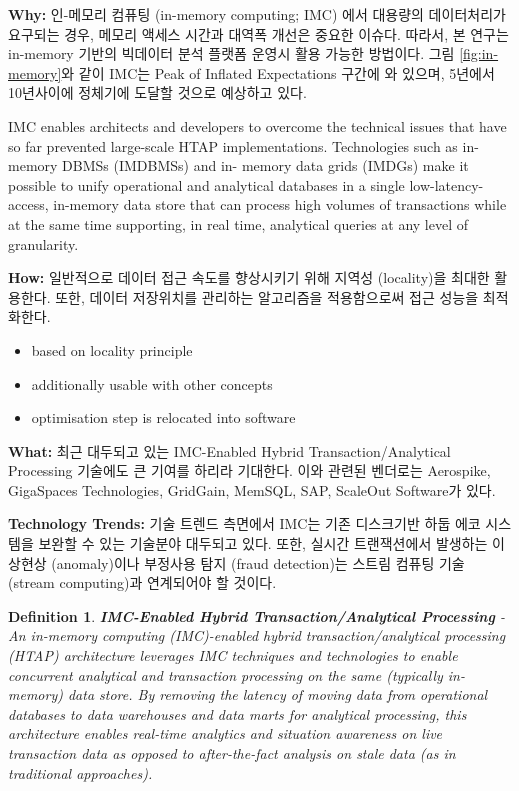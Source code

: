 \documentclass[twocolumn]{article}
\newcommand{\bi}{\begin{itemize}}
\newcommand{\ei}{\end{itemize}}
\newcommand{\ii}{\item}
\newtheorem{Def}{Definition}
\begin{document}
\noindent
\textbf{Why:} 인-메모리 컴퓨팅 (in-memory computing; IMC) \cite{Massimo:2014}에서 대용량의 데이터처리가 요구되는 경우, 메모리 액세스 시간과 대역폭 개선은 중요한 이슈다. 
따라서, 본 연구는 in-memory 기반의 빅데이터 분석 플랫폼 운영시 활용 가능한 방법이다. 
그림 \ref{fig:in-memory}와 같이 IMC는 Peak of Inflated Expectations 구간에 와 있으며, 5년에서 10년사이에 정체기에 도달할 것으로 예상하고 있다. 

IMC enables architects and developers to overcome the technical issues that have so far prevented large-scale HTAP implementations. Technologies such as in-memory DBMSs (IMDBMSs) and in- memory data grids (IMDGs) make it possible to unify operational and analytical databases in a single low-latency-access, in-memory data store that can process high volumes of transactions while at the same time supporting, in real time, analytical queries at any level of granularity.

\noindent
\textbf{How:} 일반적으로 데이터 접근 속도를 향상시키기 위해 지역성 (locality)을 최대한
 활용한다. 또한, 데이터 저장위치를 관리하는 알고리즘을 적용함으로써 접근 성능을 최적화한다.
\bi   
\ii based on locality principle
\ii additionally usable with other concepts
\ii optimisation step is relocated into software
\ei

\noindent
\textbf{What:}  
최근 대두되고 있는 IMC-Enabled Hybrid Transaction/Analytical Processing 기술에도 큰 기여를 하리라 기대한다. 이와 관련된 벤더로는 Aerospike, GigaSpaces Technologies, GridGain, MemSQL, SAP, ScaleOut Software가 있다.

\noindent
\textbf{Technology Trends:} 기술 트렌드 측면에서 IMC는 기존 디스크기반 하둡 에코 시스템을 보완할 수 있는 기술분야 대두되고 있다. 또한, 실시간 트랜잭션에서 발생하는 이상현상 (anomaly)이나 부정사용 탐지 (fraud detection)는 스트림 컴퓨팅 기술 (stream computing)과 연계되어야 할 것이다.

\begin{Def}
\textbf{IMC-Enabled Hybrid Transaction/Analytical Processing} - An \textit{in-memory computing} (IMC)-enabled hybrid transaction/analytical processing (HTAP) architecture leverages IMC techniques and technologies to enable concurrent analytical and transaction processing on the same (typically in-memory) data store. By removing the latency of moving data from operational databases to data warehouses and data marts for analytical processing, this architecture enables real-time analytics and situation awareness on live transaction data as opposed to after-the-fact analysis on stale data (as in traditional approaches).
\end{Def}
\end{document}
